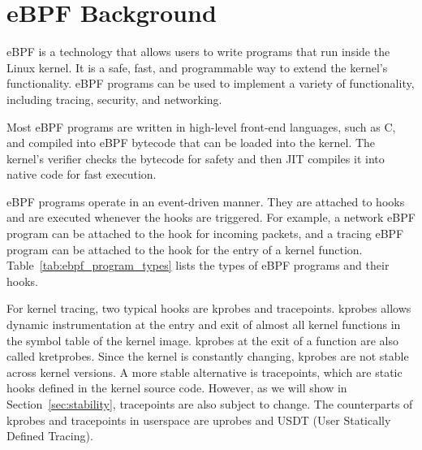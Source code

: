 \section{eBPF Background}

eBPF is a technology that allows users to write programs that run inside the Linux kernel.
It is a safe, fast, and programmable way to extend the kernel's functionality.
eBPF programs can be used to implement a variety of functionality, including tracing, security, and networking.

Most eBPF programs are written in high-level front-end languages, such as C,
and compiled into eBPF bytecode that can be loaded into the kernel.
The kernel's verifier checks the bytecode for safety and then JIT compiles it into native code for fast execution.

eBPF programs operate in an event-driven manner.
They are attached to hooks and are executed whenever the hooks are triggered.
For example, a network eBPF program can be attached to the hook for incoming packets,
and a tracing eBPF program can be attached to the hook for the entry of a kernel function.
Table~\ref{tab:ebpf_program_types} lists the types of eBPF programs and their hooks.

For kernel tracing, two typical hooks are kprobes and tracepoints.
kprobes allows dynamic instrumentation at the entry and exit of almost all kernel functions in the symbol table of the kernel image.
kprobes at the exit of a function are also called kretprobes.
Since the kernel is constantly changing, kprobes are not stable across kernel versions.
A more stable alternative is tracepoints, which are static hooks defined in the kernel source code.
However, as we will show in Section~\ref{sec:stability}, tracepoints are also subject to change.
The counterparts of kprobes and tracepoints in userspace are uprobes and USDT (User Statically Defined Tracing).



